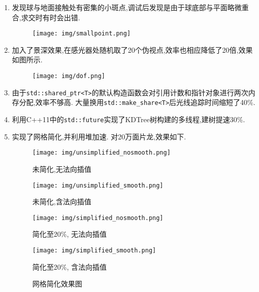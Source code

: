 \begin{enumerate}
  \item 发现球与地面接触处有密集的小斑点,调试后发现是由于球底部与平面略微重合,求交时有时会出错.
    \begin{figure}[H]
      \centering
      \texttt{[image: img/smallpoint.png]}
    \end{figure}

  \item 加入了景深效果,在感光器处随机取了20个伪视点,效率也相应降低了20倍,效果如图所示.
    \begin{figure}[H]
      \centering
      \texttt{[image: img/dof.png]}
      \caption*{\label{fig:dof}}
    \end{figure}

  \item 由于\verb|std::shared_ptr<T>|的默认构造函数会对引用计数和指针对象进行两次内存分配,效率不够高.
    大量换用\verb|std::make_share<T>|后光线追踪时间缩短了40\%.

  \item 利用C++11中的\verb|std::future|实现了KDTree树构建的多线程,建树提速30\%.

  \item 实现了网格简化,并利用堆加速. 对20万面片龙,效果如下.
    \begin{figure}[H]
      \begin{minipage}[b]{0.46\linewidth}
        \centering
        \texttt{[image: img/unsimplified\_nosmooth.png]}
        \caption*{未简化,无法向插值}
      \end{minipage}
      \begin{minipage}[b]{0.46\linewidth}
        \centering
        \texttt{[image: img/unsimplified\_smooth.png]}
        \caption*{未简化,含法向插值}
      \end{minipage}

      \begin{minipage}[b]{0.46\linewidth}
        \centering
        \texttt{[image: img/simplified\_nosmooth.png]}
        \caption*{简化至20\%, 无法向插值}
      \end{minipage}
      \begin{minipage}[b]{0.46\linewidth}
        \centering
        \texttt{[image: img/simplified\_smooth.png]}
        \caption*{简化至20\%, 含法向插值}
      \end{minipage}
      \caption{网格简化效果图\label{fig:simplify}}

    \end{figure}


\end{enumerate}
